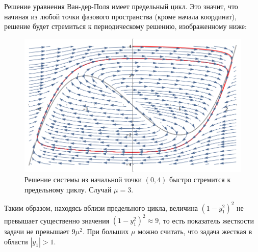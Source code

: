 \documentclass[12pt]{article}
\begin{document}
Решение уравнения Ван-дер-Поля имеет предельный цикл. Это значит, что начиная из любой точки фазового пространства (кроме начала координат), решение будет стремиться к периодическому решению, изображенному ниже:
\begin{figure}[ht!]
\centering
\includegraphics[width=\textwidth]{limit.png}
\caption{Решение системы из начальной точки $(0,4)$ быстро стремится к предельному циклу. Случай $\mu = 3$.}
\end{figure}

Таким образом, находясь вблизи предельного цикла, величина $(1 - y_1^2)^2$ не превышает существенно значения $(1 - y_1^2)^2 \approx 9$, то есть показатель жесткости задачи не превышает $9\mu^2$. При больших $\mu$ можно считать, что задача жесткая в области $|y_1| > 1$.
\end{document}
